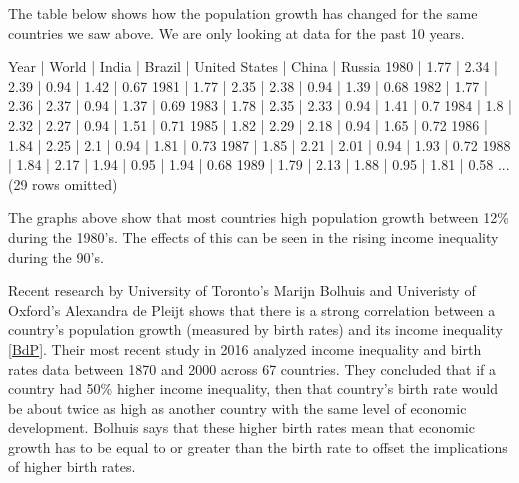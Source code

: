 \documentclass[letterpaper,10pt,english]{jupyterBook}
\begin{document}
\sphinxAtStartPar
The table below shows how the population growth has changed for the same countries we saw above. We are only looking at data for the past 10 years.

\begin{sphinxVerbatim}[commandchars=\\\{\}]
  
\end{sphinxVerbatim}

\begin{sphinxVerbatim}[commandchars=\\\{\}]
Year | World | India | Brazil | United States | China | Russia
1980 | 1.77  | 2.34  | 2.39   | 0.94          | 1.42  | 0.67
1981 | 1.77  | 2.35  | 2.38   | 0.94          | 1.39  | 0.68
1982 | 1.77  | 2.36  | 2.37   | 0.94          | 1.37  | 0.69
1983 | 1.78  | 2.35  | 2.33   | 0.94          | 1.41  | 0.7
1984 | 1.8   | 2.32  | 2.27   | 0.94          | 1.51  | 0.71
1985 | 1.82  | 2.29  | 2.18   | 0.94          | 1.65  | 0.72
1986 | 1.84  | 2.25  | 2.1    | 0.94          | 1.81  | 0.73
1987 | 1.85  | 2.21  | 2.01   | 0.94          | 1.93  | 0.72
1988 | 1.84  | 2.17  | 1.94   | 0.95          | 1.94  | 0.68
1989 | 1.79  | 2.13  | 1.88   | 0.95          | 1.81  | 0.58
... (29 rows omitted)
\end{sphinxVerbatim}

\noindent{}

\noindent{}

\sphinxAtStartPar
The graphs above show that most countries high population growth between 1\sphinxhyphen{}2\% during the 1980’s. The effects of this can be seen in the rising income inequality during the 90’s.

\sphinxAtStartPar
Recent research by University of Toronto’s Marijn Bolhuis and Univeristy of Oxford’s Alexandra de Pleijt shows that there is a strong correlation between a country’s population growth (measured by birth rates) and its income inequality {[}\hyperlink{cite.content/references:id5}{BdP}{]}. Their most recent study in 2016 analyzed income inequality and birth rates data between 1870 and 2000 across 67 countries. They concluded that if a country had 50\% higher income inequality, then that country’s birth rate would be about twice as high as another country with the same level of economic development. Bolhuis says that these higher birth rates mean that economic growth has to be equal to or greater than the birth rate to offset the implications of higher birth rates.
\end{document}
